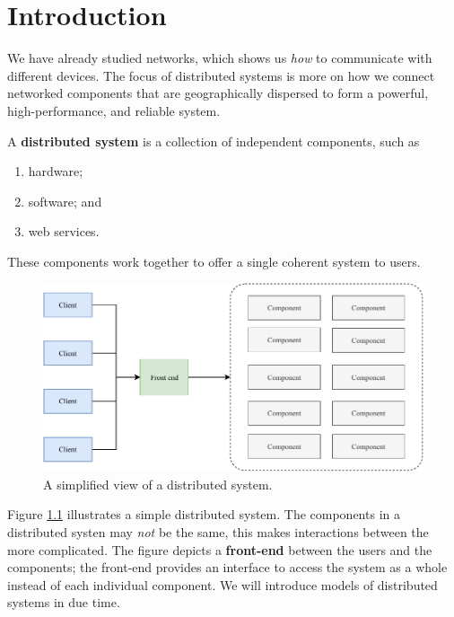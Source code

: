 \chapter{Introduction}

We have already studied networks, 
which shows us \emph{how} to communicate with different devices.
The focus of distributed systems is more on how we connect networked components
that are geographically dispersed to form a powerful, high-performance, and
reliable system.

\begin{definition}
    A \textbf{distributed system} is a collection of independent components,
    such as
    \begin{enumerate}
        \item hardware;
        \item software; and
        \item web services.
    \end{enumerate}
    These components work together to offer a single coherent system to users.
\end{definition}

\begin{figure}
    \centering
    \includegraphics[width=0.8\linewidth]{images/simple-distributed-system.pdf}
    \caption{A simplified view of a distributed system.}
    \label{fig:simple-distributed-system}
\end{figure}

\begin{example}
    Figure \ref{fig:simple-distributed-system} illustrates a simple distributed system. 
    The components in a distributed systen may \emph{not} be the same,
    this makes interactions between the more complicated.
    The figure depicts a \textbf{front-end} between the users and the components;
    the front-end provides an interface to access the system as a whole instead of
    each individual component.
    We will introduce models of distributed systems in due time.
\end{example}

